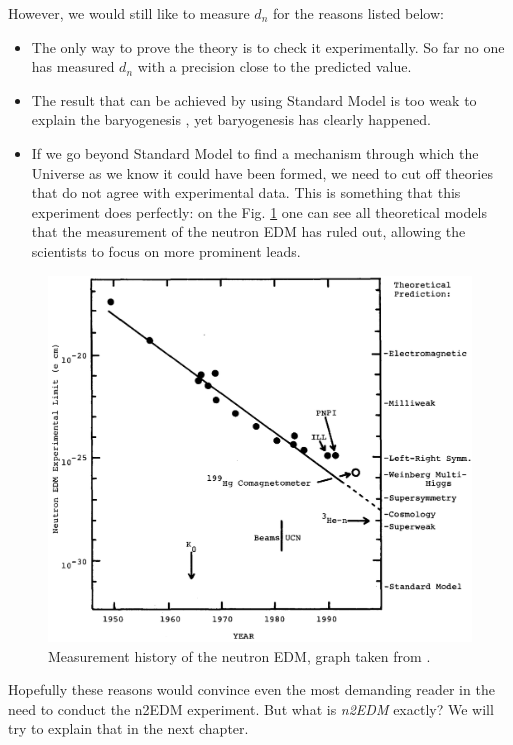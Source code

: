 However, we would still like to measure $d_n$ for the reasons listed below:
\begin{itemize}
	\item The only way to prove the theory is to check it experimentally. So far no one has measured $d_n$ with a precision close to the predicted value.
	\item The result that can be achieved by using Standard Model is too weak to explain the baryogenesis \cite{Dubbers2011}, yet baryogenesis has clearly happened.
	\item If we go beyond Standard Model to find a mechanism through which the Universe as we know it could have been formed, we need to cut off theories that do not agree with experimental data. This is something that this experiment does perfectly: on the Fig. \ref{fig:edm_history} one can see all theoretical models that the measurement of the neutron EDM has ruled out, allowing the scientists to focus on more prominent leads.
\end{itemize}

\begin{figure}[h]
	\includegraphics[width=\textwidth]{img/history_of_nedm_measurements}
	\caption{Measurement history of the neutron EDM, graph taken from \cite{Golub1994}.}
	\label{fig:edm_history}
\end{figure}

Hopefully these reasons would convince even the most demanding reader in the need to conduct the n2EDM experiment. But what is \textit{n2EDM} exactly? We will try to explain that in the next chapter.
